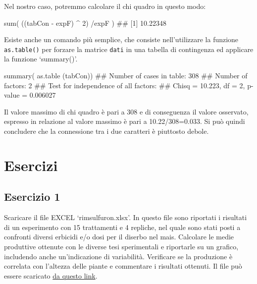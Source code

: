 \documentclass[a4paper,12pt,oneside]{book}
\newenvironment{Shaded}{}{}
\newcommand{\KeywordTok}[1]{#1}
\newcommand{\DecValTok}[1]{#1}
\newcommand{\StringTok}[1]{#1}
\newcommand{\CommentTok}[1]{#1}
\newcommand{\OperatorTok}[1]{#1}
\newcommand{\NormalTok}[1]{#1}
\begin{document}
Nel nostro caso, potremmo calcolare il chi quadro in questo modo:

\begin{Shaded}
\begin{Highlighting}[]
\KeywordTok{sum}\NormalTok{( ((tabCon }\OperatorTok{-}\StringTok{ }\NormalTok{expF) }\OperatorTok{^}\StringTok{ }\DecValTok{2}\NormalTok{) }\OperatorTok{/}\NormalTok{expF )}
\CommentTok{## [1] 10.22348}
\end{Highlighting}
\end{Shaded}

Esiste anche un comando più semplice, che consiste nell'utilizzare la funzione \texttt{as.table()} per forzare la matrice \texttt{dati} in una tabella di contingenza ed applicare la funzione `summary()'.

\begin{Shaded}
\begin{Highlighting}[]
\KeywordTok{summary}\NormalTok{( }\KeywordTok{as.table}\NormalTok{ (tabCon))}
\CommentTok{## Number of cases in table: 308 }
\CommentTok{## Number of factors: 2 }
\CommentTok{## Test for independence of all factors:}
\CommentTok{##  Chisq = 10.223, df = 2, p-value = 0.006027}
\end{Highlighting}
\end{Shaded}

Il valore massimo di chi quadro è pari a 308 e di conseguenza il valore osservato, espresso in relazione al valore massimo è pari a 10.22/308=0.033. Si può quindi concludere che la connessione tra i due caratteri è piuttosto debole.

\hypertarget{esercizi-2}{%
\section*{Esercizi}\label{esercizi-2}}

\hypertarget{esercizio-1}{%
\subsection*{Esercizio 1}\label{esercizio-1}}

Scaricare il file EXCEL `rimsulfuron.xlsx'.
In questo file sono riportati i risultati di un esperimento con 15 trattamenti e 4 repliche, nel quale sono stati posti a confronti diversi erbicidi e/o dosi per il diserbo nel mais. Calcolare le medie produttive ottenute con le diverse tesi sperimentali e riportarle su un grafico, includendo anche un'indicazione di variabilità. Verificare se la produzione è correlata con l'altezza delle piante e commentare i risultati ottenuti. Il file può essere scaricato \href{https://www.casaonofri.it/_datasets/rimsulfuron.xlsx}{da questo link}.
\end{document}
